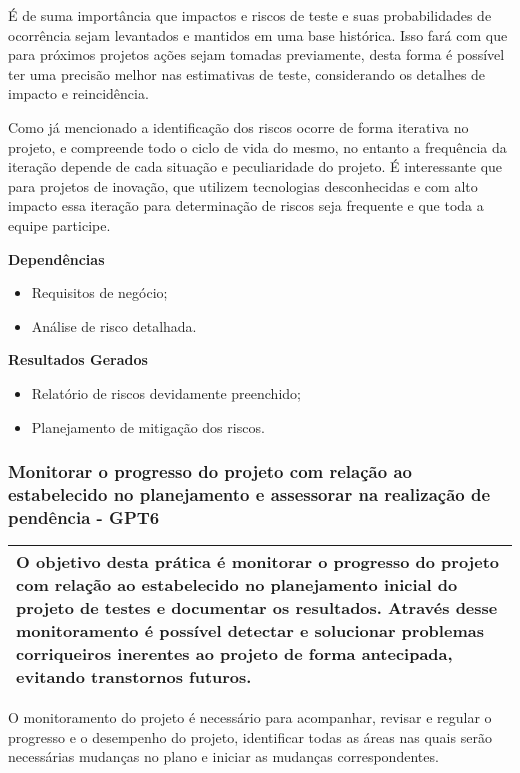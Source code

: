 É de suma importância que impactos e riscos de teste e suas probabilidades de ocorrência sejam levantados e mantidos em uma base histórica. Isso fará com que para próximos projetos ações sejam tomadas previamente, desta forma é possível ter uma precisão melhor nas estimativas de teste, considerando os detalhes de impacto e reincidência.

Como já mencionado a identificação dos riscos ocorre de forma iterativa no projeto, e compreende todo o ciclo de vida do mesmo, no entanto a frequência da iteração depende de cada situação e peculiaridade do projeto. É interessante que para projetos de inovação, que utilizem tecnologias desconhecidas e com alto impacto essa iteração para determinação de riscos seja frequente e que toda a equipe participe.

\textbf{Dependências}
\begin{itemize}
\item Requisitos de negócio;
\item Análise de risco detalhada.
\end{itemize}

\textbf{Resultados Gerados}
\begin{itemize}
\item Relatório de riscos devidamente preenchido;
\item Planejamento de mitigação dos riscos.
\end{itemize}

\subsubsection{Monitorar o progresso do projeto com relação ao estabelecido no planejamento e assessorar na realização de pendência - GPT6}
\label{sec:gpt6}

\begin{table}[!ht]
\centering
\begin{tabular}{|p{130mm}|}
\hline
O objetivo desta prática é monitorar o progresso do projeto com relação ao estabelecido no planejamento inicial do projeto de testes e documentar os resultados. Através desse monitoramento é possível detectar e solucionar problemas corriqueiros inerentes ao projeto de forma antecipada, evitando transtornos futuros. \\ 
\hline
\end{tabular}
\end{table}

O monitoramento do projeto é necessário para acompanhar, revisar e regular o progresso e o desempenho do projeto, identificar todas as áreas nas quais serão necessárias mudanças no plano e iniciar as mudanças correspondentes.

